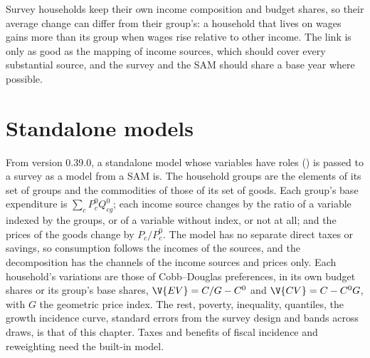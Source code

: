 Survey households keep their own income composition and budget shares, so
their average change can differ from their group's: a household that lives on
wages gains more than its group when wages rise relative to other income. The
link is only as good as the mapping of income sources, which should cover
every substantial source, and the survey and the SAM should share a base year
where possible.

\section{Standalone models}\label{sec:sa-microsim}

From version 0.39.0, a standalone model whose variables have roles
() is passed to a survey as a model from a SAM is. The
household groups are the elements of its set of groups and the commodities of
 those of its set of goods. Each group's base expenditure is
$\sum_c P^0_c Q^0_{cg}$; each income source changes by the ratio of a
variable indexed by the groups, or of a variable without index, or not at
all; and the prices of the goods change by $P_c/P^0_c$. The model has no
separate direct taxes or savings, so consumption follows the incomes of the
sources, and the decomposition has the channels of the income sources and
prices only. Each household's variations are those of Cobb--Douglas
preferences, in its own budget shares or its group's base shares, $\V{EV} =
C/G - C^0$ and $\V{CV} = C - C^0 G$, with $G$ the geometric price index. The
rest, poverty, inequality, quantiles, the growth incidence curve, standard
errors from the survey design and bands across draws, is that of this
chapter. Taxes and benefits of fiscal incidence and reweighting need the
built-in model.
